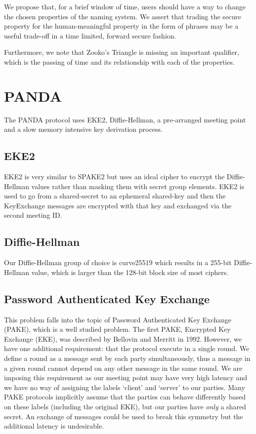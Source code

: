 \documentclass[letterpaper,twocolumn,10pt]{article}
\begin{document}
We propose that, for a brief window of time, users should have a way to
change the chosen properties of the naming system.  We assert that trading the
secure property for the human-meaningful property in the form of phrases may be
a useful trade-off in a time limited, forward secure fashion.

Furthermore, we note that Zooko's Triangle is missing an important qualifier,
which is the passing of time and its relationship with each of the properties.

\section{PANDA}

The PANDA protocol uses EKE2, Diffie-Hellman, a pre-arranged meeting point and
a slow memory intensive key derivation process.

\subsection{EKE2}

EKE2 is very similar to SPAKE2 but uses an ideal cipher to encrypt the
Diffie-Hellman values rather than masking them with secret group elements. EKE2
is used to go from a shared-secret to an ephemeral shared-key and then the
KeyExchange messages are encrypted with that key and exchanged via the second
meeting ID.

\subsection{Diffie-Hellman}

Our Diffie-Hellman group of choice is curve25519\cite{bernstein2006curve25519}
which results in a 255-bit Diffie-Hellman value, which is larger than the
128-bit block size of most ciphers.

\subsection{Password Authenticated Key Exchange}

This problem falls into the topic of Password Authenticated Key Exchange
(PAKE), which is a well studied problem. The first PAKE, Encrypted Key Exchange
(EKE), was described by Bellovin and Merritt\cite{bellovin1992encrypted} in
1992. However, we have one additional requirement: that the protocol execute in
a single round. We define a round as a message sent by each party
simultaneously, thus a message in a given round cannot depend on any other
message in the same round.  We are imposing this requirement as our meeting
point may have very high latency and we have no way of assigning the labels
`client' and `server' to our parties.  Many PAKE protocols implicitly assume
that the parties can behave differently based on these labels (including the
original EKE), but our parties have {\it only} a shared secret. An exchange of
messages could be used to break this symmetry but the additional latency is
undesirable.
\end{document}
